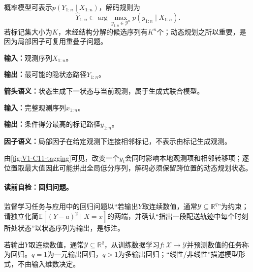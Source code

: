 概率模型可表示$p(Y_{1:n}\mid X_{1:n})$，解码规则为
\[
\widehat Y_{1:n}\in
\arg\max_{y_{1:n}\in\mathcal Y^n}p(y_{1:n}\mid X_{1:n}).
\]
若标记集大小为$K$，未经结构分解的候选序列有$K^n$个；动态规划之所以重要，是因为局部因子可复用重叠子问题。

\label{struct:V1-C11-CH17}
\begin{center}
\begin{minipage}[t]{0.47\linewidth}
\begin{keypointbox}[title=HMM任务卡]
\textbf{输入：}观测序列$X_{1:n}$。\par
\textbf{输出：}最可能的隐状态路径$Y_{1:n}$。\par
\textbf{箭头语义：}状态生成下一状态与当前观测，属于生成式联合模型。
\end{keypointbox}
\end{minipage}\hfill
\begin{minipage}[t]{0.47\linewidth}
\begin{keypointbox}[title=CRF任务卡]
\textbf{输入：}完整观测序列$x_{1:n}$。\par
\textbf{输出：}条件得分最高的标记路径$y_{1:n}$。\par
\textbf{因子语义：}局部因子在给定观测下连接相邻标记，不表示由标记生成观测。
\end{keypointbox}
\end{minipage}
\end{center}

由\cref{fig:V1-C11-tagging}可见，改变一个$y_t$会同时影响本地观测项和相邻转移项；逐位置取最大值因此可能拼出全局低分序列，解码必须保留跨位置的动态规划状态。


\paragraph{读前自检：回归问题。}监督学习任务与应用中的回归问题以“若输出$Y$取连续数值，通常$\mathcal Y\subseteq\mathbb R^q$”为约束；请独立化简$\mathbb E[(Y-a)^2\mid X=x]$的两端，并确认“指出一段配送轨迹中每个时刻所处状态”以状态序列为输出，是标注。\par

\begin{definition}[回归任务]
若输出$Y$取连续数值，通常$\mathcal Y\subseteq\mathbb R^q$，从训练数据学习$f:\mathcal X\to\mathcal Y$并预测数值的任务称为回归。$q=1$为一元输出回归，$q>1$为多输出回归；“线性/非线性”描述模型形式，不由输入维数决定。
\end{definition}

